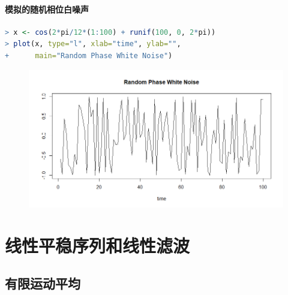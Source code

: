 \documentclass[11pt,a4paper,oneside]{book}
\begin{document}
\subsubsection{模拟的随机相位白噪声}
\begin{lstlisting}[language=r]
> x <- cos(2*pi/12*(1:100) + runif(100, 0, 2*pi))
> plot(x, type="l", xlab="time", ylab="",
+      main="Random Phase White Noise")
\end{lstlisting}
\begin{figure}[H]
	\centering
	\includegraphics[width=\textwidth]{14.png}
\end{figure}

\chapter{线性平稳序列和线性滤波}
\section{有限运动平均}
\end{document}
